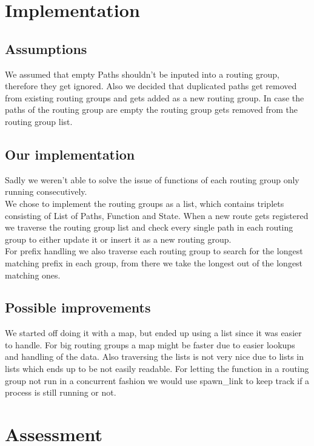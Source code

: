\documentclass[12pt,a4paper]{article}
\begin{document}
\section{Implementation}

\subsection{Assumptions}
We assumed that empty Paths shouldn't be inputed into a routing group, therefore they get ignored.
Also we decided that duplicated paths get removed from existing routing groups and gets added as a new routing group.
In case the paths of the routing group are empty the routing group gets removed from the routing group list.

\subsection{Our implementation}
Sadly we weren't able to solve the issue of functions of each routing group only running consecutively.\\
We chose to implement the routing groups as a list, which contains triplets consisting of List of Paths, Function and State.
When a new route gets registered we traverse the routing group list and check every single path in each routing group to either update it or insert it as a new routing group.\\

For prefix handling we also traverse each routing group to search for the longest matching prefix in each group, from there we take the longest out of the longest matching ones.

\subsection{Possible improvements}
We started off doing it with a map, but ended up using a list since it was easier to handle.
For big routing groups a map might be faster due to easier lookups and handling of the data.
Also traversing the lists is not very nice due to lists in lists which ends up to be not easily readable.
For letting the function in a routing group not run in a concurrent fashion we would use spawn\_link to keep track if a process is still running or not.

\section{Assessment}
\end{document}
